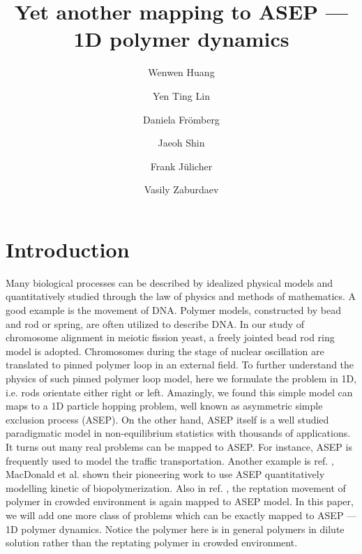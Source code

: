 \documentclass[aps,showpacs,twocolumn,floatfix,prx,superscriptaddress]{revtex4-1}
\begin{document}
\title{Yet another mapping to ASEP --- 1D polymer dynamics}

\author{Wenwen Huang}
\author{Yen Ting Lin}
\author{Daniela Fr\"{o}mberg}
\author{Jaeoh Shin}
\author{Frank J\"{u}licher}
\author{Vasily Zaburdaev}

\begin{abstract}
{}
\end{abstract}
\maketitle


\section{Introduction}
Many biological processes can be described by idealized physical models and
quantitatively studied through the law of physics and methods of mathematics.  A
good example is the movement of DNA. Polymer models, constructed by bead and rod
or spring, are often utilized to describe DNA\cite{}.  In our study of
chromosome alignment in meiotic fission yeast, a freely jointed bead rod ring
model is adopted\cite{}. Chromosomes during the stage of nuclear oscillation are
translated to pinned polymer loop in an external field\cite{}. To further
understand the physics of such pinned polymer loop model, here we formulate the
problem in 1D, i.e. rods orientate either right or left. Amazingly, we found
this simple model can maps to a 1D particle hopping problem, well known as
asymmetric simple exclusion process (ASEP)\cite{}. On the other hand, ASEP
itself is a well studied paradigmatic model in non-equilibrium statistics with
thousands of applications\cite{}. It turns out many real problems can be mapped
to ASEP.  For instance, ASEP is frequently used to model the traffic
transportation\cite{}.  Another example is ref. \cite{}, MacDonald et al. shown
their pioneering work to use ASEP quantitatively modelling kinetic of
biopolymerization. Also in ref.  \cite{}, the reptation movement of polymer in
crowded environment is again mapped to ASEP model.  In this paper, we will add
one more class of problems which can be exactly mapped to ASEP --- 1D polymer
dynamics. Notice the polymer here is in general polymers in dilute solution rather
than the reptating polymer in crowded environment.  
\end{document}
